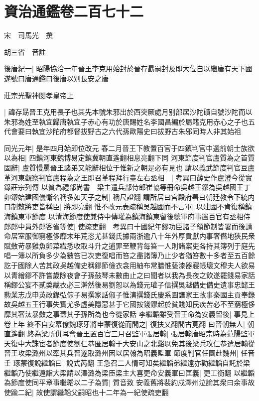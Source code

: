 \chapter{資治通鑑卷二百七十二}
宋　司馬光　撰

胡三省　音註

後唐紀一|{
	昭陽協洽一年晉王李克用始封於晉存勗嗣封及即大位自以繼唐有天下國遂號曰唐通鑑曰後唐以别長安之唐}


莊宗光聖神閔孝皇帝上

|{
	諱存勗晉王克用長子也其先本號朱邪出於西突厥處月别部居沙陀磧自號沙陀而以朱邪為姓至執宜歸唐執宜子赤心有功於唐賜姓名李國昌編於屬籍克用赤心之子也五代會要曰執宜沙陀府都督拔野古之六代孫歐陽史曰拔野古朱邪同時人非其始祖}


同光元年|{
	是年四月始即位改元}
春二月晉王下教置百官于四鎮判官中選前朝士族欲以為相|{
	四鎮河東魏博易定鎮冀朝直遙翻相息亮翻下同}
河東節度判官盧質為之首質固辭|{
	盧質慢罵晉王諸弟又能辭相位于惟新之朝是必有見也}
請以義武節度判官豆盧革河東觀察判官盧程為之王即召革程拜行臺左右丞相　|{
	考異曰薛史作盧澄今從實錄莊宗列傳}
以質為禮部尚書　梁主遣兵部侍郎崔協等冊命吳越王鏐為吳越國王丁卯鏐始建國儀衛名稱多如天子之制|{
	稱尺證翻}
謂所居曰宫殿府署曰朝廷教令下統内曰制敕將吏皆稱臣|{
	將即亮翻}
惟不改元表疏稱吳越國而不言軍|{
	以建國不肯復稱鎮海鎮東軍節度}
以清海節度使兼侍中傳瓘為鎮海鎮東留後總軍府事置百官有丞相侍郎郎中員外郎客省等使|{
	使疏吏翻　考異曰十國紀年鏐功臣諸子領節制皆署而後請命居室服御窮極侈靡末年荒恣尤甚錢氏據兩浙逾八十年外厚貢獻内事奢僭地狹民衆賦斂苛暴雞魚卵菜纎悉收取斗升之逋罪至鞭背每笞一人則諸案吏各持其簿列于庭先唱一簿以所負多少為數笞已次吏復唱而笞之盡諸簿乃止少者猶笞數十多者至五百餘訖于國除人苦其政吳越備史稱鏐節儉衣衾用紬布常膳惟甆漆器寢帳壞文穆夫人欲易以青繒鏐不許嘗歲除夜會子孫鼓琴未數曲止之曰聞者以我為長夜之飲遂罷錢易家話稱鏐公宴不貳羮胾衣必三澣然後易劉恕以為錢元瓘子信撰吳越備史備史遺事忠懿王勲業志戊申英政錄弘倧子易撰家話俶子惟演撰錢氏慶系圖譜家王故事秦國主貢奉錄故吳越五王行事失實尤多虚美隱惡甚于它國按錢鏐起於貧賤知民疾苦必不至窮極侈靡其奢汰暴斂之事蓋其子孫所為也今從家話}
李繼韜雖受晉王命為安義留後|{
	事見上卷上年}
終不自安幕僚魏琢牙將申蒙復從而間之|{
	復扶又翻間古莧翻}
曰晉朝無人|{
	朝直遙翻}
終為梁所併耳會晉王置百官三月召監軍張居翰|{
	張居翰唐昭宗時為范陽監軍天復中大誅宦者節度使劉仁恭匿居翰于大安山之北谿以免其後梁兵攻仁恭遣居翰從晉王攻梁潞州以牽其兵晉遂取潞州因以居翰為昭義監軍}
節度判官任圜赴魏州|{
	任音壬}
琢蒙復說繼韜曰|{
	說式芮翻}
王急召二人情可知矣繼韜弟繼遠亦勸繼韜自託於梁繼韜乃使繼遠詣大梁請以澤潞為梁臣梁主大喜更命安義軍曰匡義|{
	更工衡翻}
以繼韜為節度使同平章事繼韜以二子為質|{
	質音致}
安義舊將裴約戍澤州泣諭其衆曰余事故使踰二紀|{
	故使謂繼韜父嗣昭也十二年為一紀使疏吏翻}

